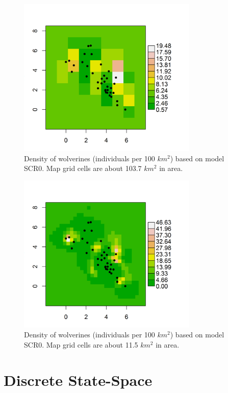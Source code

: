 {\begin{figure}
\begin{center}
\includegraphics[height=3in,width=3.375in]{Ch4/figs/density10x10}
\end{center}
\caption{Density of wolverines (individuals per 100 $km^2$) based on
  model SCR0. Map grid cells are about 103.7 $km^2$ in area.}
\label{scr0.fig.density10x10}
\end{figure}

\begin{figure}
\begin{center}
\includegraphics[height=3in,width=3.375in]{Ch4/figs/density30x30}
\end{center}
\caption{Density of wolverines (individuals per 100 $km^2$) based on
  model SCR0. Map grid cells are about 11.5 $km^2$ in area.}
\label{scr0.fig.density20x20}
\end{figure}

\section{Discrete State-Space}
\label{scr0.sec.discrete}

}
